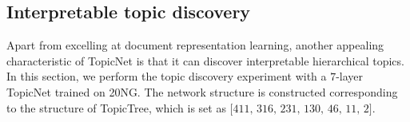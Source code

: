 \documentclass{article}
\newcommand{\mz}[1]{{\color{red}{[mz:#1]}}}
\begin{document}
\subsection{Interpretable topic discovery}
Apart from excelling at document representation learning, another appealing characteristic of TopicNet is that it can discover interpretable hierarchical topics. In this section, we perform the topic discovery experiment with a $7$-layer TopicNet trained on 20NG. The network structure is constructed corresponding to the structure of TopicTree, which is set as $\text{[411, 316, 231, 130, 46, 11, 2]}$. 
\end{document}
